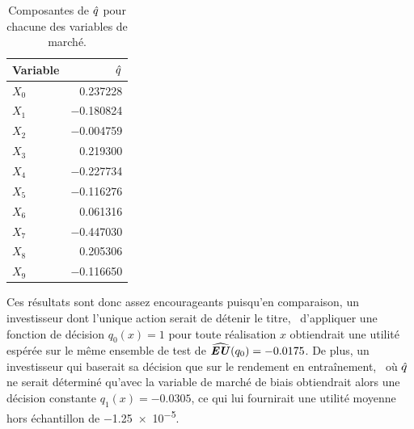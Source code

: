 \begin{table}[h]
  \centering
\begin{tabular}{lr}
  \toprule
  Variable  &  $\hat q$\\
  \midrule
  $X_0$ & \num{0.237228 }\\
  $X_1$ & \num{-0.180824}\\
  $X_2$ & \num{-0.004759}\\
  $X_3$ & \num{0.219300 }\\
  $X_4$ & \num{-0.227734}\\
  $X_5$ & \num{-0.116276}\\
  $X_6$ & \num{0.061316 }\\
  $X_7$ & \num{-0.447030}\\
  $X_8$ & \num{0.205306 }\\
  $X_9$ & \num{-0.116650}\\
  \bottomrule
\end{tabular}
\caption{Composantes de $\hat q$ pour chacune des variables de marché.}
\label{table_q}
\end{table}

Ces résultats sont donc assez encourageants puisqu'en comparaison, un investisseur dont
l'unique action serait de détenir le titre, \ie\ d'appliquer une fonction de décision
$q_0(x) = 1$ pour toute réalisation $x$ obtiendrait une utilité espérée sur le même
ensemble de test de $\operatorname{\widehat{\operatorname{\mbox{\textbf{\textit{EU}}}}}}(q_0) = \num{-0.0175}$. De plus, un investisseur qui baserait sa
décision que sur le rendement en entraînement, \ie\ où $\hat q$ ne serait déterminé qu'avec
la variable de marché de biais obtiendrait alors une décision constante
$q_1(x) = \num{-0.0305}$, ce qui lui fournirait une utilité moyenne hors échantillon de
\num{-1.25e-5}.





